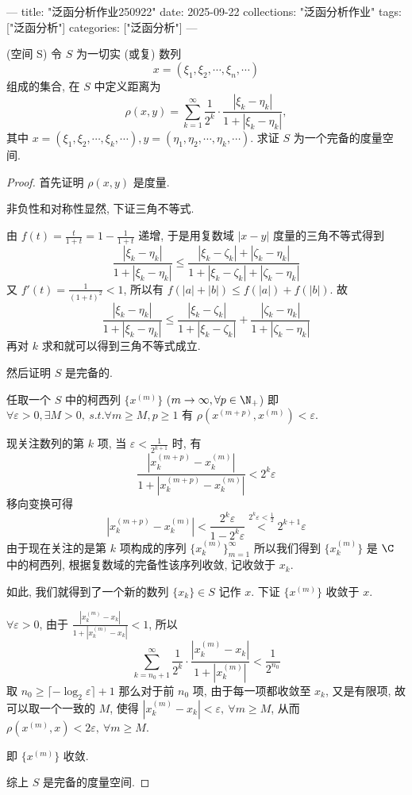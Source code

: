 ---
title: "泛函分析作业250922"
date: 2025-09-22
collections: "泛函分析作业"
tags: ["泛函分析"]
categories: ["泛函分析"]
---

\problem[1.2.1] (空间 S) 令 $S$ 为一切实 (或复) 数列 $$x=(\xi_1,\xi_2,\cdots,\xi_n,\cdots)$$ 组成的集合, 在 $S$ 中定义距离为 $$\rho(x,y)=\sum\limits_{k=1}^\infty \frac{1}{2^k}\cdot\frac{|\xi_k-\eta_k|}{1+|\xi_k-\eta_k|},$$ 其中 $x=(\xi_1,\xi_2,\cdots,\xi_k,\cdots),y=(\eta_1,\eta_2,\cdots,\eta_k,\cdots)$. 求证 $S$ 为一个完备的度量空间.

\begin{proof}
	首先证明 $\rho(x,y)$ 是度量.

	非负性和对称性显然, 下证三角不等式.

	由 $f(t)=\frac {t}{1+t}=1-\frac{1}{1+t}$ 递增, 于是用复数域 $|x-y|$ 度量的三角不等式得到 $$\frac{|\xi_k-\eta_k|}{1+|\xi_k-\eta_k|}\leqslant \frac{|\xi_k-\zeta_k|+|\zeta_k-\eta_k|}{1+|\xi_k-\zeta_k|+|\zeta_k-\eta_k|}$$ 又 $f'(t)=\frac{1}{(1+t)^2}<1$, 所以有 $f(|a|+|b|)\leqslant f(|a|)+f(|b|)$. 故 $$\frac{|\xi_k-\eta_k|}{1+|\xi_k-\eta_k|}\leqslant \frac{|\xi_k-\zeta_k|}{1+|\xi_k-\zeta_k|}+\frac{|\zeta_k-\eta_k|}{1+|\zeta_k-\eta_k|}$$ 再对 $k$ 求和就可以得到三角不等式成立.

	然后证明 $S$ 是完备的.

	任取一个 $S$ 中的柯西列 $\{x^{(m)}\}$ ($m\to\infty, \forall p\in\N_+$) 即 $\forall \varepsilon>0,\exists M>0,\ s.t. \forall m\geqslant M, p\geqslant 1$ 有 $\rho(x^{(m+p)},x^{(m)})<\varepsilon$.

	现关注数列的第 $k$ 项, 当 $\varepsilon<\frac{1}{2^{k+1}}$ 时, 有 $$\frac{|x_k^{(m+p)}-x_k^{(m)}|}{1+|x_k^{(m+p)}-x_k^{(m)}|}< 2^k\varepsilon$$ 移向变换可得 $$|x_k^{(m+p)}-x_k^{(m)}|<\frac{2^k\varepsilon}{1-2^k\varepsilon}\overset{2^k\varepsilon<\frac 1 2}{<}2^{k+1}\varepsilon$$ 由于现在关注的是第 $k$ 项构成的序列 $\{x_k^{(m)}\}_{m=1}^\infty$ 所以我们得到 $\{x_k^{(m)}\}$ 是 $\C$ 中的柯西列, 根据复数域的完备性该序列收敛, 记收敛于 $x_k$.

	如此, 我们就得到了一个新的数列 $\{x_k\}\in S$ 记作 $x$. 下证 $\{x^{(m)}\}$ 收敛于 $x$.

	$\forall \varepsilon>0$, 由于 $\frac{|x_k^{(m)}-x_k|}{1+|x_k^{(m)}-x_k|}<1$, 所以 $$\sum\limits_{k=n_0+1}^\infty \frac{1}{2^k}\cdot \frac{|x_k^{(m)}-x_k|}{1+|x_k^{(m)}|}<\frac{1}{2^{n_0}}$$ 取 $n_0\geqslant\lceil-\log_2 \varepsilon\rceil+1$ 那么对于前 $n_0$ 项, 由于每一项都收敛至 $x_k$, 又是有限项, 故可以取一个一致的 $M$, 使得 $|x_k^{(m)}-x_k|<\varepsilon,\ \forall m\geqslant M$, 从而 $\rho(x^{(m)},x)<2\varepsilon,\ \forall m\geqslant M$.

	即 $\{x^{(m)}\}$ 收敛.

	综上 $S$ 是完备的度量空间.
\end{proof}


